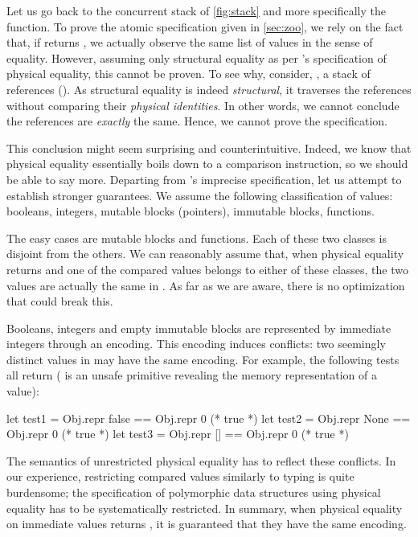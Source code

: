 Let us go back to the concurrent stack of \cref{fig:stack} and more specifically the  function.
To prove the atomic specification given in \cref{sec:zoo}, we rely on the fact that, if  returns , we actually observe the same list of values in the sense of \Rocq equality.
However, assuming only structural equality as per \OCaml's specification of physical equality, this cannot be proven.
To see why, consider, \eg, a stack of references ().
As structural equality is indeed \emph{structural}, it traverses the references without comparing their \emph{physical identities}.
In other words, we cannot conclude the references are \emph{exactly} the same.
Hence, we cannot prove the specification.

This conclusion might seem surprising and counterintuitive.
Indeed, we know that physical equality essentially boils down to a comparison instruction, so we should be able to say more.
Departing from \OCaml's imprecise specification, let us attempt to establish stronger guarantees.
We assume the following classification of values: booleans, integers, mutable blocks (pointers), immutable blocks, functions.

The easy cases are mutable blocks and functions.
Each of these two classes is disjoint from the others.
We can reasonably assume that, when physical equality returns  and one of the compared values belongs to either of these classes, the two values are actually the same in \Rocq.
As far as we are aware, there is no optimization that could break this.

Booleans, integers and empty immutable blocks are represented by immediate integers through an encoding.
This encoding induces conflicts: two seemingly distinct values in \Rocq may have the same encoding.
For example, the following tests all return  ( is an unsafe primitive revealing the memory representation of a value):

\begin{ocamlcode}
let test1 = Obj.repr false == Obj.repr 0 (* true *)
let test2 = Obj.repr None  == Obj.repr 0 (* true *)
let test3 = Obj.repr []    == Obj.repr 0 (* true *)
\end{ocamlcode}

The semantics of unrestricted physical equality has to reflect these conflicts.
In our experience, restricting compared values similarly to typing is quite burdensome; the specification of polymorphic data structures using physical equality has to be systematically restricted.
In summary, when physical equality on immediate values returns , it is guaranteed that they have the same encoding.

